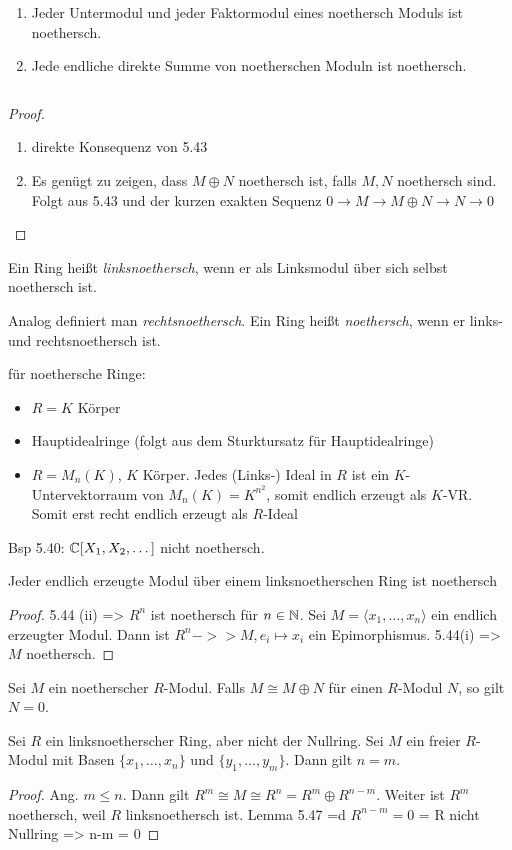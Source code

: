 \documentclass[../main.tex]{subfiles}
\begin{document}
\begin{corollary} $ $
    \begin{enumerate}[label=(\roman*)]
        \item Jeder Untermodul und jeder Faktormodul eines noethersch Moduls ist noethersch.
        \item Jede endliche direkte Summe von noetherschen Moduln ist noethersch.
    \end{enumerate}
\end{corollary} $ $
\begin{proof}$ $
    \begin{enumerate}[label=(\roman*)]
        \item direkte Konsequenz von 5.43
        \item Es genügt zu zeigen, dass $M\oplus N$ noethersch ist, falls $M,N$ noethersch sind. Folgt aus 5.43 und der kurzen exakten Sequenz $0\rightarrow M \rightarrow M\oplus N \rightarrow N \rightarrow 0$
    \end{enumerate}
\end{proof}

\begin{definition}
    Ein Ring heißt \emph{linksnoethersch}, wenn er als Linksmodul über sich selbst noethersch ist.

    Analog definiert man \emph{rechtsnoethersch}.
    Ein Ring heißt \emph{noethersch}, wenn er links- und rechtsnoethersch ist.
\end{definition}
\begin{example*}
    für noethersche Ringe:
    \begin{itemize}
        \item $R=K$ Körper
        \item Hauptidealringe (folgt aus dem Sturktursatz für Hauptidealringe)
        \item $R=M_n(K)$, $K$ Körper. Jedes (Links-) Ideal in $R$ ist ein $K$-Untervektorraum von $M_n(K) = K^{n^2}$, somit endlich erzeugt als $K$-VR. Somit erst recht endlich erzeugt als $R$-Ideal
    \end{itemize}
    Bsp 5.40: $\mathbb{C}[X_1,X_2,\dots]$ nicht noethersch.
\end{example*}
\begin{lemma}
    Jeder endlich erzeugte Modul über einem linksnoetherschen Ring ist noethersch
\end{lemma}
\begin{proof}
    5.44 (ii) => $R^n$ ist noethersch für $n\in \mathbb{N}$.
    Sei $M=\langle x_1, \dots, x_n\rangle$ ein endlich erzeugter Modul. Dann ist $R^n ->> M, e_i\mapsto x_i$ ein Epimorphismus.
    5.44(i) => $M$ noethersch.
\end{proof}
\begin{lemma}
    Sei $M$ ein noetherscher $R$-Modul. Falls $M\cong M\oplus N$ für einen $R$-Modul $N$, so gilt $N=0$.
\end{lemma}
\begin{theorem}
    Sei $R$ ein linksnoetherscher Ring, aber nicht der Nullring.
    Sei $M$ ein freier $R$-Modul mit Basen $\{x_1,\dots,x_n\}$ und $\{y_1,\dots,y_m\}$. Dann gilt $n=m$.
\end{theorem}

\begin{proof}
    Ang. $m\leq n$. Dann gilt $R^m\cong M\cong R^n = R^m \oplus R^{n-m}$. Weiter ist $R^m$ noethersch, weil $R$ linksnoethersch ist.
    Lemma 5.47 =d $R^{n-m} = 0$  = R nicht Nullring => n-m = 0 
\end{proof}
\end{document}

